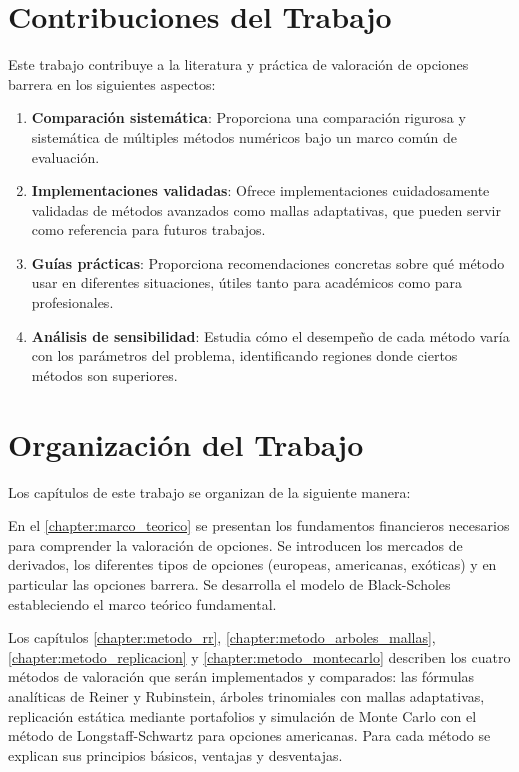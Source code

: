 \section{Contribuciones del Trabajo}

Este trabajo contribuye a la literatura y práctica de valoración de opciones barrera en los siguientes aspectos:

\begin{enumerate}
    \item \textbf{Comparación sistemática}: Proporciona una comparación rigurosa y sistemática de múltiples métodos numéricos bajo un marco común de evaluación.
    
    \item \textbf{Implementaciones validadas}: Ofrece implementaciones cuidadosamente validadas de métodos avanzados como mallas adaptativas, que pueden servir como referencia para futuros trabajos.
    
    \item \textbf{Guías prácticas}: Proporciona recomendaciones concretas sobre qué método usar en diferentes situaciones, útiles tanto para académicos como para profesionales.
    
    \item \textbf{Análisis de sensibilidad}: Estudia cómo el desempeño de cada método varía con los parámetros del problema, identificando regiones donde ciertos métodos son superiores.
\end{enumerate}

\section{Organización del Trabajo}

Los capítulos de este trabajo se organizan de la siguiente manera:

En el \autoref{chapter:marco_teorico} se presentan los fundamentos financieros necesarios para comprender la valoración de opciones. Se introducen los mercados de derivados, los diferentes tipos de opciones (europeas, americanas, exóticas) y en particular las opciones barrera. Se desarrolla el modelo de Black-Scholes estableciendo el marco teórico fundamental.

Los capítulos \autoref{chapter:metodo_rr}, \autoref{chapter:metodo_arboles_mallas}, \autoref{chapter:metodo_replicacion} y \autoref{chapter:metodo_montecarlo} describen los cuatro métodos de valoración que serán implementados y comparados: las fórmulas analíticas de Reiner y Rubinstein, árboles trinomiales con mallas adaptativas, replicación estática mediante portafolios y simulación de Monte Carlo con el método de Longstaff-Schwartz para opciones americanas. Para cada método se explican sus principios básicos, ventajas y desventajas.

